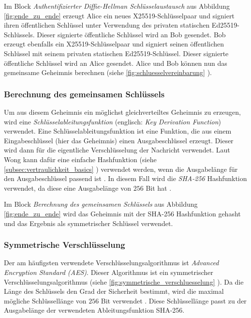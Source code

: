 Im Block \textit{Authentifizierter Diffie-Hellman Schlüsselaustausch} aus Abbildung \ref{fig:ende_zu_ende} erzeugt Alice ein neues X25519-Schlüsselpaar und signiert ihren öffentlichen Schlüssel unter Verwendung des privaten statischen Ed25519-Schlüssels. Dieser signierte öffentliche Schlüssel wird an Bob gesendet. Bob erzeugt ebenfalls ein X25519-Schlüsselpaar und signiert seinen öffentlichen Schlüssel mit seinem privaten statischen Ed25519-Schlüssel. Dieser signierte öffentliche Schlüssel wird an Alice gesendet. Alice und Bob können nun das gemeinsame Geheimnis berechnen (siehe \ref{fig:schluesselvereinbarung} \textit{}).


\subsubsection{Berechnung des gemeinsamen Schlüssels}

Um aus diesem Geheimnis ein möglichst gleichverteiltes Geheimnis zu erzeugen, wird eine \textit{Schlüsselableitungsfunktion} (englisch: \textit{Key Derivation Function}) verwendet. Eine Schlüsselableitungsfunktion ist eine Funktion, die aus einem Eingabeschlüssel (hier das Geheimnis) einen Ausgabeschlüssel erzeugt. Dieser wird dann für die eigentliche Verschlüsselung der Nachricht verwendet. Laut Wong kann dafür eine einfache Hashfunktion (siehe \ref{subsec:vertraulichkeit_basics} \textit{}) verwendet werden, wenn die Ausgabelänge für den Ausgabeschlüssel passend ist \Parencite[S. 194]{Wong_KryptoPraxis}. In diesem Fall wird die \textit{SHA-256} Hashfunktion verwendet, da diese eine Ausgabelänge von $256$ Bit hat \Parencite{rfc6234_SHA2}.

Im Block \textit{Berechnung des gemeinsamen Schlüssels} aus Abbildung \ref{fig:ende_zu_ende} wird das Geheimnis mit der SHA-256 Hashfunktion gehasht und das Ergebnis als symmetrischer Schlüssel verwendet.


\subsubsection{Symmetrische Verschlüsselung}

Der am häufigsten verwendete Verschlüsselungsalgorithmus ist \textit{Advanced Encryption Standard (AES)}. Dieser Algorithmus ist ein symmetrischer Verschlüsselungsalgorithmus (siehe \ref{fig:symmetrische_verschluesselung} \textit{}). Da die Länge des Schlüssels den Grad der Sicherheit bestimmt, wird die maximal mögliche Schlüssellänge von $256$ Bit verwendet \parencite[S. 76]{Wong_KryptoPraxis}. 
Diese Schlüssellänge passt zu der Ausgabelänge der verwendeten Ableitungsfunktion SHA-256.

